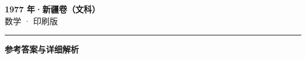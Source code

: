 \documentclass[zihao=5, a4paper]{ctexart}
\begin{document}
\begin{center}
  {\Large\bfseries 1977 年·新疆卷（文科）}\\[4pt]
  {\large 数学 · 印刷版}
\end{center}
\medskip
{}

\par\bigskip\hrule\bigskip
{}
\begin{center}{\large\bfseries 参考答案与详细解析}\end{center}
\smallskip

\end{document}
